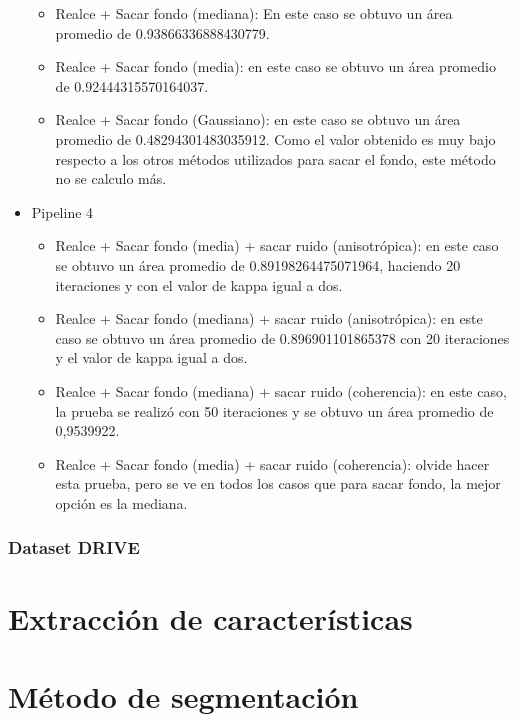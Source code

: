 \begin{itemize}
\begin{itemize}
			\item Realce + Sacar fondo (mediana): En este caso se obtuvo un área promedio de 0.93866336888430779.
			\item Realce + Sacar fondo (media): en este caso se obtuvo un área promedio de 0.92444315570164037.
			\item Realce + Sacar fondo (Gaussiano): en este caso se obtuvo un área promedio de 0.48294301483035912. Como el valor obtenido es muy bajo respecto a los otros métodos utilizados para sacar el fondo, este método no se calculo más.
		\end{itemize}
	\item Pipeline 4
		\begin{itemize}
			\item Realce + Sacar fondo (media) + sacar ruido (anisotrópica): en este caso se obtuvo un área promedio de 0.89198264475071964, haciendo 20 iteraciones y con el valor de kappa igual a dos.
			\item Realce + Sacar fondo (mediana) + sacar ruido (anisotrópica): en este caso se obtuvo un área promedio de 0.896901101865378 con 20 iteraciones y el valor de kappa igual a dos.
			\item Realce + Sacar fondo (mediana) + sacar ruido (coherencia): en este caso, la prueba se realizó con 50 iteraciones y se obtuvo un área promedio de 0,9539922.
			\item Realce + Sacar fondo (media) + sacar ruido (coherencia): olvide hacer esta prueba, pero se ve en todos los casos que para sacar fondo, la mejor opción es la mediana.
		\end{itemize}
\end{itemize}


\subsubsection{Dataset DRIVE}



\section{Extracci\'on de caracter\'isticas}



\section{M\'etodo de segmentaci\'on}

